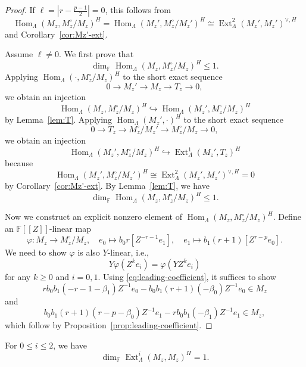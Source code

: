 \documentclass[11pt,a4paper]{article} %
\def\FF{\mathbb{F}}
\def\dim{\operatorname{dim}}
\def\Ext{\operatorname{Ext}} %
\def\Hom{\operatorname{Hom}}
\begin{document}
\begin{proof}
    If $\ell=|r-\frac{p-1}{2}|=0$, this follows from
    \[
    \Hom_\Lambda(M_z,M_z^\circ/M_z)^H=\Hom_\Lambda(M_z',M_z^\circ/M_z')^H\cong\Ext_\Lambda^2(M_z',M_z')^{\vee,H}
    \]
    and Corollary~\ref{cor:Mz'-ext}. 
    
    Assume $\ell\ne0$. We first prove that 
    \[
    \dim_\FF\Hom_\Lambda(M_z,M_z^\circ/M_z)^H\le1.
    \] 
    Applying $\Hom_\Lambda(\cdot,M_z^\circ/M_z)^H$ to the short exact sequence
    \[
    0\longrightarrow M_z'\longrightarrow M_z\longrightarrow T_z\longrightarrow0,
    \]
    we obtain an injection
    \[
    \Hom_\Lambda(M_z,M_z^\circ/M_z)^H\hookrightarrow\Hom_\Lambda(M_z',M_z^\circ/M_z)^H
    \]
    by Lemma~\ref{lem:T}. Applying $\Hom_\Lambda(M_z',\cdot)^H$ to the short exact sequence
    \[
    0\longrightarrow T_z\longrightarrow M_z^\circ/M_z'
    \longrightarrow M_z^\circ/M_z\longrightarrow0,
    \]
    we obtain an injection
    \[
    \Hom_\Lambda(M_z',M_z^\circ/M_z)^H\hookrightarrow\Ext^1_\Lambda(M_z',T_z)^H
    \]
    because 
    \[
    \Hom_\Lambda(M_z',M_z^\circ/M_z')^H\cong\Ext^2_{\Lambda}(M_z',M_z')^{\vee,H}=0
    \]
    by Corollary~\ref{cor:Mz'-ext}. By Lemma~\ref{lem:T}, we have
    \[
    \dim_\FF\Hom_\Lambda(M_z,M_z^\circ/M_z)^H\le1.
    \]

    Now we construct an explicit nonzero element of $\Hom_\Lambda(M_z,M_z^\circ/M_z)^H$. Define an $\FF[[Z]]$-linear map
    \[
    \varphi:M_z\longrightarrow M_z^\circ/M_z,\quad e_0\mapsto b_0r[Z^{-r-1}e_1],\quad e_1\mapsto b_1(r+1)[Z^{r-p}e_0].
    \]
    We need to show $\varphi$ is also $Y$-linear, i.e.,
    \[
    Y\varphi(Z^ke_i)=\varphi(YZ^ke_i)
    \]
    for any $k\ge0$ and $i=0,1$. Using \eqref{eq:leading-coefficient}, it suffices to show
    \[
    rb_0b_1(-r-1-\beta_1)Z^{-1}e_0-b_0b_1(r+1)(-\beta_0)Z^{-1}e_0\in M_z
    \]
    and
    \[
    b_0b_1(r+1)(r-p-\beta_0)Z^{-1}e_1-rb_0b_1(-\beta_1)Z^{-1}e_1\in M_z,
    \]
    which follow by Proposition~\ref{prop:leading-coefficient}.
\end{proof}

\begin{proposition}\label{prop:z-z-ext}
    For $0\le i\le2$, we have
    \[
    \dim_\FF\Ext^i_{\Lambda}(M_z,M_z)^{H}=1.
    \]
\end{proposition}
\end{document}

